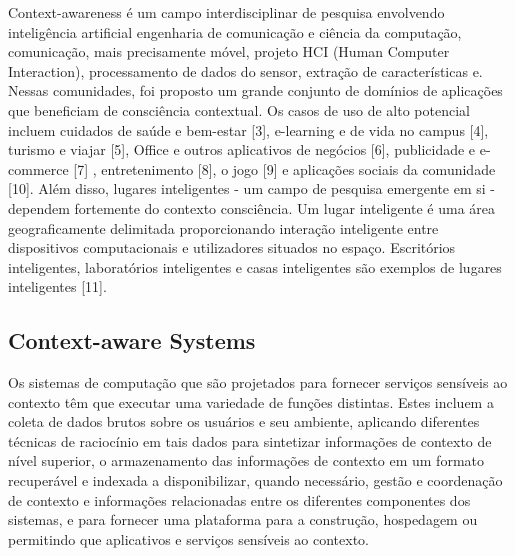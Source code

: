 \documentclass[12pt]{article} %
\begin{document}
Context-awareness é um campo interdisciplinar de pesquisa envolvendo inteligência artificial engenharia de comunicação e ciência da computação, comunicação, mais precisamente móvel, projeto HCI (Human Computer Interaction), processamento de dados do sensor, extração de características e. Nessas comunidades, foi proposto um grande conjunto de domínios de aplicações que beneficiam de consciência contextual. Os casos de uso de alto potencial incluem cuidados de saúde e bem-estar [3], e-learning e de vida no campus [4], turismo e viajar [5], Office e outros aplicativos de negócios [6], publicidade e e-commerce [7] , entretenimento [8], o jogo [9] e aplicações sociais da comunidade [10]. Além disso, lugares inteligentes - um campo de pesquisa emergente em si - dependem fortemente do contexto consciência. Um lugar inteligente é uma área geograficamente delimitada proporcionando interação inteligente entre dispositivos computacionais e utilizadores situados no espaço. Escritórios inteligentes, laboratórios inteligentes e casas inteligentes são exemplos de lugares inteligentes [11].


\subsection{Context-aware Systems} %


Os sistemas de computação que são projetados para fornecer serviços sensíveis ao contexto têm que executar uma variedade de funções distintas. Estes incluem a coleta de dados brutos sobre os usuários e seu ambiente, aplicando diferentes técnicas de raciocínio em tais dados para sintetizar informações de contexto de nível superior, o armazenamento das informações de contexto em um formato recuperável e indexada a disponibilizar, quando necessário, gestão e coordenação de contexto e informações relacionadas entre os diferentes componentes dos sistemas, e para fornecer uma plataforma para a construção, hospedagem ou permitindo que aplicativos e serviços sensíveis ao contexto.
\end{document}
